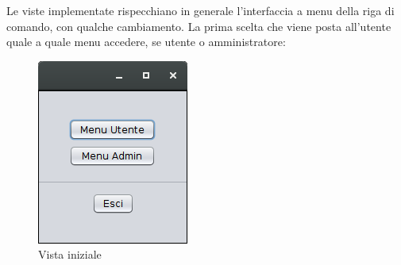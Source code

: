 \clearpage
Le viste implementate rispecchiano in generale l'interfaccia a menu della riga di comando, con qualche cambiamento. La prima scelta che viene posta all'utente quale a quale menu accedere, se utente o amministratore:

\begin{figure}[!htbp]
	\centering
	\includegraphics[width=.3\textwidth]{images/menu_gui}
	\caption{Vista iniziale}
\end{figure}

